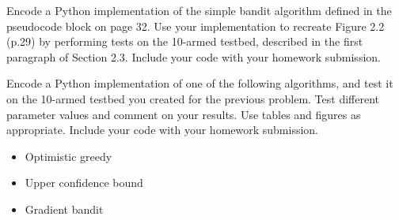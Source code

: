 \documentclass[12pt,letterpaper]{exam}
\newcommand\chapter{1}
\begin{document}
\begin{questions}
	\renewcommand\chapter{ }


	\question%
	Encode a Python implementation of the simple bandit algorithm defined in the pseudocode block on page 32. 
	Use your implementation to recreate Figure 2.2 (p.29) by performing tests on the 10-armed testbed, 
	described in the first paragraph of Section 2.3. Include your code with your homework submission.
	
	\begin{solution}
	
	\end{solution}

	\question%
	Encode a Python implementation of one of the following algorithms, and test it on the 10-armed testbed you created for the previous problem. 
	Test different parameter values and comment on your results. 
	Use tables and figures as appropriate. Include your code with your homework submission.
	\begin{itemize}
		\item Optimistic greedy
		\item Upper confidence bound 
		\item Gradient bandit
	\end{itemize}
	
	\begin{solution}
	
	\end{solution}


\end{questions}
\end{document}

